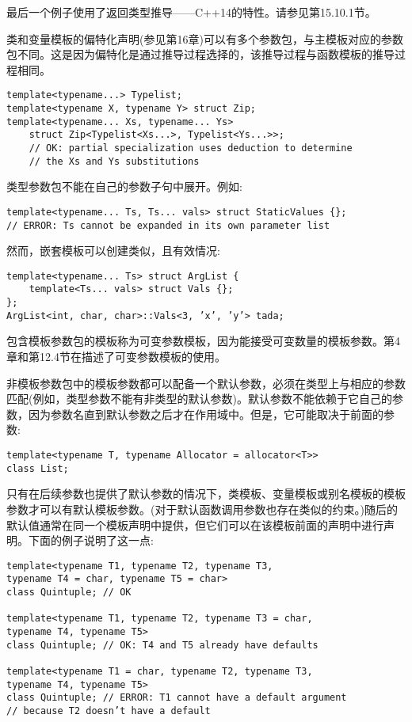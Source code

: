 最后一个例子使用了返回类型推导——C++14的特性。请参见第15.10.1节。

类和变量模板的偏特化声明(参见第16章)可以有多个参数包，与主模板对应的参数包不同。这是因为偏特化是通过推导过程选择的，该推导过程与函数模板的推导过程相同。

\begin{lstlisting}[style=styleCXX]
template<typename...> Typelist;
template<typename X, typename Y> struct Zip;
template<typename... Xs, typename... Ys>
	struct Zip<Typelist<Xs...>, Typelist<Ys...>>;
	// OK: partial specialization uses deduction to determine
	// the Xs and Ys substitutions
\end{lstlisting}

类型参数包不能在自己的参数子句中展开。例如:

\begin{lstlisting}[style=styleCXX]
template<typename... Ts, Ts... vals> struct StaticValues {};
// ERROR: Ts cannot be expanded in its own parameter list
\end{lstlisting}

然而，嵌套模板可以创建类似，且有效情况:

\begin{lstlisting}[style=styleCXX]
template<typename... Ts> struct ArgList {
	template<Ts... vals> struct Vals {};
};
ArgList<int, char, char>::Vals<3, ’x’, ’y’> tada;
\end{lstlisting}

包含模板参数包的模板称为可变参数模板，因为能接受可变数量的模板参数。第4章和第12.4节在描述了可变参数模板的使用。


非模板参数包中的模板参数都可以配备一个默认参数，必须在类型上与相应的参数匹配(例如，类型参数不能有非类型的默认参数)。默认参数不能依赖于它自己的参数，因为参数名直到默认参数之后才在作用域中。但是，它可能取决于前面的参数:

\begin{lstlisting}[style=styleCXX]
template<typename T, typename Allocator = allocator<T>>
class List;
\end{lstlisting}

只有在后续参数也提供了默认参数的情况下，类模板、变量模板或别名模板的模板参数才可以有默认模板参数。(对于默认函数调用参数也存在类似的约束。)随后的默认值通常在同一个模板声明中提供，但它们可以在该模板前面的声明中进行声明。下面的例子说明了这一点:

\begin{lstlisting}[style=styleCXX]
template<typename T1, typename T2, typename T3,
typename T4 = char, typename T5 = char>
class Quintuple; // OK

template<typename T1, typename T2, typename T3 = char,
typename T4, typename T5>
class Quintuple; // OK: T4 and T5 already have defaults

template<typename T1 = char, typename T2, typename T3,
typename T4, typename T5>
class Quintuple; // ERROR: T1 cannot have a default argument
// because T2 doesn’t have a default
\end{lstlisting}

